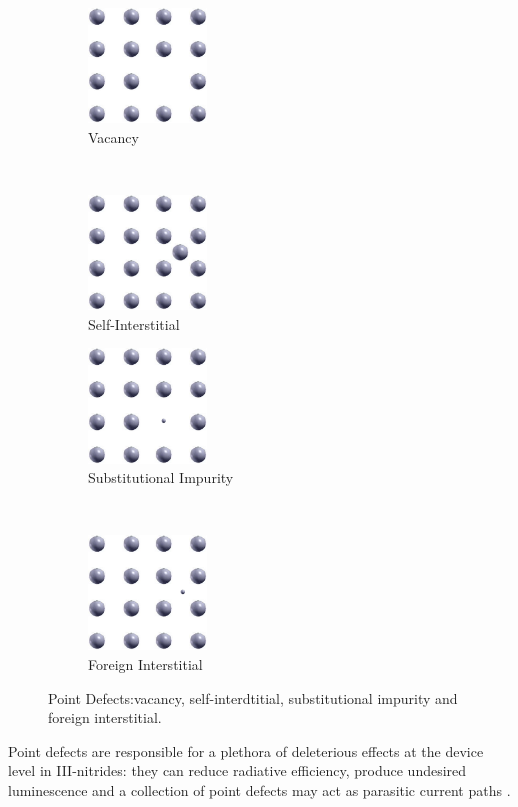 \begin{figure}[t!]
	\centering
	\begin{subfigure}[t]{0.3\textwidth}
		\centering
		\includegraphics[height=1.2in]{Figs/Ch1/vacancy.png}
		\caption{Vacancy}
		\vspace*{1cm}
	\end{subfigure}%
	~ 
	\begin{subfigure}[t]{0.3\textwidth}
		\centering
		\includegraphics[height=1.2in]{Figs/Ch1/self-inter.png}
		\caption{Self-Interstitial}
	\end{subfigure}
	
	\begin{subfigure}[b]{0.3\textwidth}
		\centering
		\includegraphics[height=1.2in]{Figs/Ch1/sub-impure.png}
		\caption{Substitutional Impurity}
	\end{subfigure}%
	~ 
	\begin{subfigure}[b]{0.3\textwidth}
		\centering
		\includegraphics[height=1.2in]{Figs/Ch1/foreign.png}
		\caption{Foreign Interstitial}
	\end{subfigure}
	\caption{Point Defects:vacancy, self-interdtitial, substitutional impurity and foreign interstitial.}
	\label{1.6}
\end{figure}
\FloatBarrier
 Point defects are responsible for a plethora of deleterious effects at the device level in III-nitrides: they can reduce radiative efficiency, produce undesired luminescence and a collection of point defects may act as parasitic current paths \cite{Reshchikov2005}.
 

